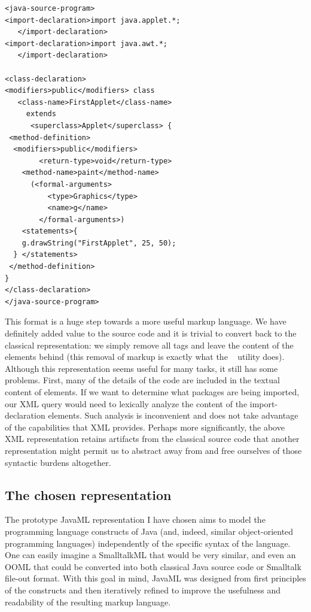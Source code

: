 \documentclass{article}
\begin{document}
\begin{multicols}{2}
{\small
\begin{verbatim}
<java-source-program>
<import-declaration>import java.applet.*;
   </import-declaration>
<import-declaration>import java.awt.*;
   </import-declaration>

<class-declaration>
<modifiers>public</modifiers> class 
   <class-name>FirstApplet</class-name> 
     extends 
      <superclass>Applet</superclass> {
 <method-definition>
  <modifiers>public</modifiers>
        <return-type>void</return-type> 
    <method-name>paint</method-name>
      (<formal-arguments>
          <type>Graphics</type> 
          <name>g</name>
        </formal-arguments>) 
    <statements>{
    g.drawString("FirstApplet", 25, 50);
  } </statements>
 </method-definition>
}
</class-declaration>
</java-source-program>
\end{verbatim}
}

This format is a huge step towards a more useful markup language.  We
have definitely added value to the source code and it is trivial to
convert back to the classical representation: we simply remove all tags
and leave the content of the elements behind (this removal of markup is
exactly what the ~\cite{perlSGML} utility does).
Although this representation seems useful for many tasks, it still has
some problems.  First, many of the details of the code are included in
the textual content of elements.  If we want to determine what packages
are being imported, our XML query would need to lexically analyze the
content of the import-declaration elements.  Such analysis is
inconvenient and does not take advantage of the capabilities that XML
provides.  Perhaps more significantly, the above XML representation
retains artifacts from the classical source code that another
representation might permit us to abstract away from and free ourselves
of those syntactic burdens altogether.

\subsection{The chosen representation}

The prototype JavaML representation I have chosen aims to model the
programming language constructs of Java (and, indeed, similar
object-oriented programming languages) independently of the specific
syntax of the language.  One can easily imagine a SmalltalkML that would
be very similar, and even an OOML that could be converted into both
classical Java source code or Smalltalk file-out format.  With this goal
in mind, JavaML was designed from first principles of the constructs and
then iteratively refined to improve the usefulness and readability of
the resulting markup language.


\end{multicols}
\end{document}
